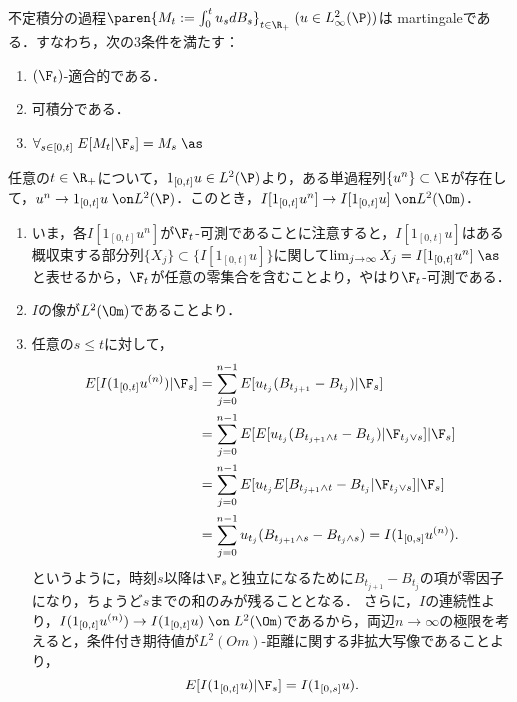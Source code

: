 \documentclass[uplatex,dvipdfmx]{jsreport}
\begin{document}
\begin{proposition}
    不定積分の過程$\paren{M_t:=\int^t_0 u_sdB_s}_{t\in\R_+}\;(u\in L^2_\infty(\P))$は
    martingaleである．すなわち，次の3条件を満たす：
    \begin{enumerate}
        \item $(\F_t)$-適合的である．
        \item 可積分である．
        \item $\forall_{s\in[0,t]}\;E[M_t|\F_s]=M_s\;\as$
    \end{enumerate}
\end{proposition}
\begin{Proof}
    任意の$t\in\R_+$について，$1_{[0,t]}u\in L^2(\P)$より，ある単過程列$\{u^n\}\subset\E$が存在して，$u^n\to 1_{[0,t]}u\;\on L^2(\P)$．このとき，$I[1_{[0,t]}u^n]\to I[1_{[0,t]}u]\;\on L^2(\Om)$．
    \begin{enumerate}
        \item いま，各$I[1_{[0,t]}u^n]$が$\F_t$-可測であることに注意すると，$I[1_{[0,t]}u]$はある概収束する部分列$\{X_j\}\subset\{I[1_{[0,t]}u]\}$に関して$\lim_{j\to\infty}X_j=I[1_{[0,t]}u^n]\;\as$と表せるから，$\F_t$が任意の零集合を含むことより，やはり$\F_t$-可測である．
        \item $I$の像が$L^2(\Om)$であることより．
        \item 任意の$s\le t$に対して，
        \begin{align*}
            E[I(1_{[0,t]}u^{(n)})|\F_s]&=\sum^{n-1}_{j=0}E[u_{t_j}(B_{t_{j+1}}-B_{t_j})|\F_s]\\
            &=\sum^{n-1}_{j=0}E[E[u_{t_j}(B_{t_{j+1}\land t}-B_{t_j})|\F_{t_j\lor s}]|\F_s]\\
            &=\sum^{n-1}_{j=0}E[u_{t_{j}}E[B_{t_{j+1}\land t}-B_{t_j}|\F_{t_j\lor s}]|\F_s]\\
            &=\sum_{j=0}^{n-1}u_{t_j}(B_{t_{j+1}\land s}-B_{t_j\land s})=I(1_{[0,s]}u^{(n)}).
        \end{align*}
        というように，時刻$s$以降は$\F_s$と独立になるために$B_{t_{j+1}}-B_{t_j}$の項が零因子になり，ちょうど$s$までの和のみが残ることとなる．
        さらに，$I$の連続性より，$I(1_{[0,t]}u^{(n)})\to I(1_{[0,t]}u)\;\on\;L^2(\Om)$であるから，両辺$n\to\infty$の極限を考えると，条件付き期待値が$L^2(Om)$-距離に関する非拡大写像であることより，
        \[E[I(1_{[0,t]}u)|\F_s]=I(1_{[0,s]}u).\]
    \end{enumerate}
\end{Proof}
\end{document}
